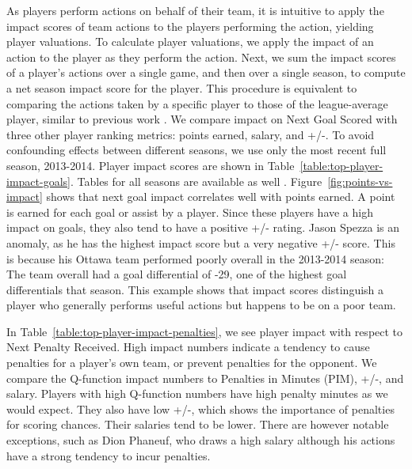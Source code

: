 \documentclass[]{article}
\begin{document}
As players perform actions on behalf of their team, it is intuitive to apply the impact scores of team actions to the players performing the action, yielding player valuations.
To calculate player valuations, we apply the impact of an action to the player as they perform the action.
Next, we sum the impact scores of a player's actions over a single game, and then over a single season, to compute a net season impact score for the player. This procedure is equivalent to comparing the actions taken by a specific player to those of the league-average player, similar to previous work \citep{Pettigrew2015,Cervone2014a}.
We compare impact on Next Goal Scored with three other player ranking metrics: points earned, salary, and +/-.
To avoid confounding effects between different seasons, we use only the most recent full season, 2013-2014.
Player impact scores are shown in Table~\ref{table:top-player-impact-goals}. Tables for all seasons are available as well \citep{Routley2015}.
Figure~\ref{fig:points-vs-impact} shows that next goal impact correlates well with points earned. A point is earned for each goal or assist by a player.
Since these players have a high impact on goals, they also tend to have a positive +/- rating.
Jason Spezza is an anomaly, as he has the highest impact score but a very negative +/- score. This is because his Ottawa team performed poorly overall in the 2013-2014 season: The team overall had a goal differential of -29, one of the highest goal differentials that season. This example shows that impact scores distinguish a player who generally performs useful actions but happens to be on a poor team.

In Table~\ref{table:top-player-impact-penalties}, we see player impact with respect to Next Penalty Received. High impact numbers indicate a tendency to cause penalties for a player's own team, or prevent penalties for the opponent. We compare the Q-function impact numbers to Penalties in Minutes (PIM), +/-, and salary. Players with high Q-function numbers have high penalty minutes as we would expect. They also have low +/-, which shows the importance of penalties for scoring chances. Their salaries tend to be lower. There are however notable exceptions, such as Dion Phaneuf, who draws a high salary although his actions have a strong tendency to incur penalties.
\end{document}
